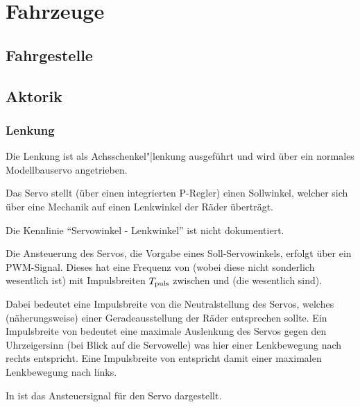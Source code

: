 
\chapter{Fahrzeuge}


\section{Fahrgestelle}


\section{Aktorik}

\subsection{Lenkung}

Die Lenkung ist als Achsschenkel"|lenkung ausgeführt und wird über ein normales Modellbauservo angetrieben.

Das Servo stellt (über einen integrierten P-Regler) einen Sollwinkel, welcher sich über eine Mechanik auf einen Lenkwinkel der Räder überträgt.

Die Kennlinie "`Servowinkel - Lenkwinkel"' ist nicht dokumentiert.

Die Ansteuerung des Servos, \dah die Vorgabe eines Soll-Servowinkels, erfolgt über ein PWM-Signal. Dieses hat eine Frequenz von  (wobei diese nicht sonderlich wesentlich ist) mit Impulsbreiten $T_{\mathrm{puls}}$ zwischen  und  (die wesentlich sind).

Dabei bedeutet eine Impulsbreite von  die Neutralstellung des Servos, welches (näherungsweise) einer Geradeausstellung der Räder entsprechen sollte. Ein Impulsbreite von  bedeutet eine maximale Auslenkung des Servos gegen den Uhrzeigersinn (bei Blick auf die Servowelle) was hier einer Lenkbewegung nach rechts entspricht. Eine Impulsbreite von  entspricht damit einer maximalen Lenkbewegung nach links.

In  ist das Ansteuersignal für den Servo dargestellt.

